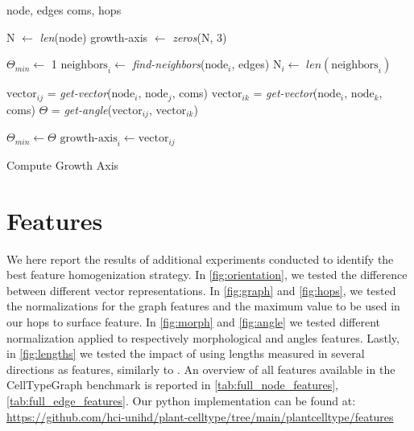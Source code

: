 \documentclass[10pt,twocolumn,letterpaper]{article}
\begin{document}
\begin{algorithm*}
\begin{algorithmic}
\Require node, edges 
\Require coms, hops 

\State N $\gets$ \textit{len}(node)
\State  growth-axis $\gets$ \textit{zeros}(N, 3) 

    \State $\Theta_{min} \gets$ 1
    \State $\text{neighbors}_i \gets$ \textit{find-neighbors}($\text{node}_i$, edges) 
    \State $\text{N}_i \gets$ $\textit{len}(\text{neighbors}_i)$

     
        \State $\text{vector}_{ij}$ = \textit{get-vector}($\text{node}_i$, $\text{node}_j$, coms) 
            \State $\text{vector}_{ik}$ = \textit{get-vector}($\text{node}_i$, $\text{node}_k$, coms)
            \State $\Theta$ = \textit{get-angle}($\text{vector}_{ij}$, $\text{vector}_{ik}$) 
            
             
                \State $\Theta_{min} \gets \Theta$
                \State $\text{growth-axis}_i \gets \text{vector}_{ij}$
            \EndIf
        \EndFor
    \EndFor

\EndFor
\end{algorithmic}
\caption{Compute Growth Axis}\label{alg:growth}
\end{algorithm*}

\section{Features}
\label{suppl:sec3}
We here report the results of additional experiments conducted to identify the best feature homogenization strategy. In \cref{fig:orientation}, we tested the difference between different vector representations. In \cref{fig:graph} and  \cref{fig:hops}, we tested the normalizations for the graph features and the maximum value to be used in our hops to surface feature. In \cref{fig:morph} and \cref{fig:angle} we tested different normalization applied to respectively morphological and angles features. Lastly, in \cref{fig:lengths} we tested the impact of using lengths measured in several directions as features, similarly to \cite{schmidt2014irocs}.
An overview of all features available in the CellTypeGraph benchmark is reported in \cref{tab:full_node_features}, \cref{tab:full_edge_features}. Our python implementation can be found at: \url{https://github.com/hci-unihd/plant-celltype/tree/main/plantcelltype/features}
\end{document}
